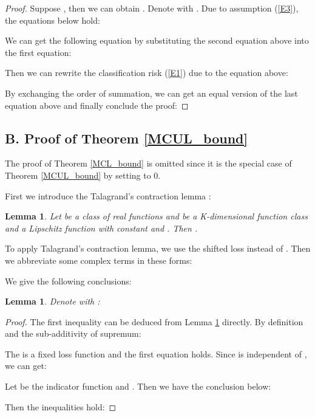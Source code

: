 \documentclass[]{article} \usepackage{geometry}
\newtheorem{lemma}[theorem]{Lemma}
\begin{document}
\begin{proof}
Suppose , then we can obtain . Denote  with . Due to assumption (\ref{E3}), the equations below hold:

We can get the following equation by substituting the second equation above into the first equation:

Then we can rewrite the classification risk (\ref{E1}) due to the equation above:

By exchanging the order of summation, we can get an equal version of the last equation above and finally conclude the proof:

\end{proof}



\subsection*{B. Proof of Theorem \ref{MCUL_bound}}
\label{AB}
The proof of Theorem \ref{MCL_bound} is omitted since it is the special case of Theorem \ref{MCUL_bound} by setting  to 0. 

First we introduce the Talagrand's contraction lemma \cite{tala}:
\begin{lemma}
\label{L7}
Let  be a class of real functions and  be a K-dimensional function class and  a Lipschitz function with constant  and  . Then .
\end{lemma}



To apply Talagrand's contraction lemma, we use the shifted loss  instead of . Then we abbreviate some complex terms in these forms:



We give the following conclusions:
\begin{lemma} Denote  with :

\end{lemma}
\begin{proof}
The first inequality can be deduced from Lemma \ref{L7} directly. By definition and the sub-additivity of supremum: 

The  is a fixed loss function and the first equation holds. Since  is independent of , we can get:

Let  be the indicator function and . Then we have the conclusion below:

Then the inequalities hold:

\end{proof}
\end{document}
